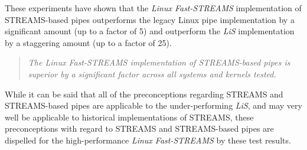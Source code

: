 \documentclass[letterpaper,final,notitlepage,twocolumn,10pt,twoside]{article}
\begin{document}
These experiments have shown that the \textsl{Linux Fast-STREAMS}
implementation of STREAMS-based pipes outperforms the legacy Linux pipe
implementation by a significant amount (up to a factor of 5) and outperform
the \textsl{LiS} implementation by a staggering amount (up to a factor of 25).

\begin{quote}
\textit{The \textsl{Linux Fast-STREAMS} implementation of STREAMS-based pipes
is superior by a significant factor across all systems and kernels tested.}
\end{quote}

While it can be said that all of the preconceptions regarding STREAMS and
STREAMS-based pipes are applicable to the under-performing \textsl{LiS}, and
may very well be applicable to historical implementations of STREAMS, these
preconceptions with regard to STREAMS and STREAMS-based pipes are dispelled
for the high-performance \textsl{Linux Fast-STREAMS} by these test results.
\end{document}

